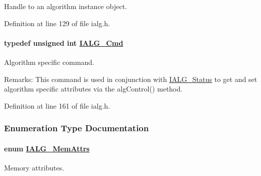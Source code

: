 Handle to an algorithm instance object. 



Definition at line 129 of file ialg.h.\hypertarget{group__ti__xdais___i_a_l_g_g9032f20923ef2ba1d6b88c87a20075fa}{
\paragraph[IALG\_\-Cmd]{\setlength{\rightskip}{0pt plus 5cm}typedef unsigned int \hyperlink{group__ti__xdais___i_a_l_g_g9032f20923ef2ba1d6b88c87a20075fa}{IALG\_\-Cmd}}\hfill}
\label{group__ti__xdais___i_a_l_g_g9032f20923ef2ba1d6b88c87a20075fa}


Algorithm specific command. 

\begin{Desc}
\item[Remarks:]This command is used in conjunction with \hyperlink{struct_i_a_l_g___status}{IALG\_\-Status} to get and set algorithm specific attributes via the alg\-Control() method. \end{Desc}


Definition at line 161 of file ialg.h.

\subsubsection{Enumeration Type Documentation}
\hypertarget{group__ti__xdais___i_a_l_g_g805f1c1330403c05633277a073862e3d}{
\paragraph[IALG\_\-MemAttrs]{\setlength{\rightskip}{0pt plus 5cm}enum \hyperlink{group__ti__xdais___i_a_l_g_g805f1c1330403c05633277a073862e3d}{IALG\_\-Mem\-Attrs}}\hfill}
\label{group__ti__xdais___i_a_l_g_g805f1c1330403c05633277a073862e3d}


Memory attributes. 

